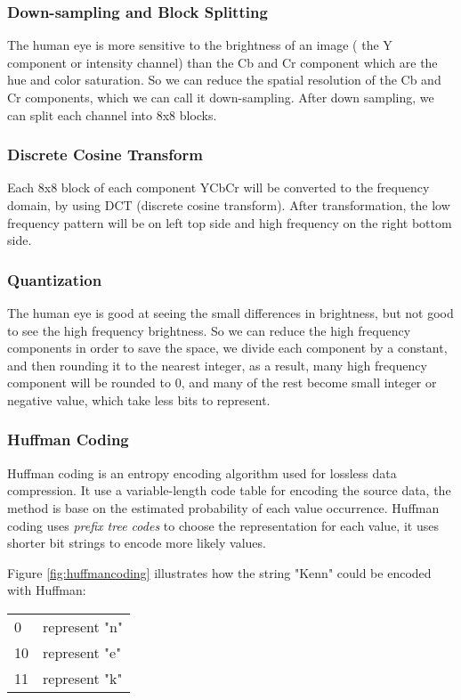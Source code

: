 \subsubsection{Down-sampling and Block Splitting}
The human eye is more sensitive to the brightness of an image ( the Y component or intensity channel) than the Cb and Cr component which are the hue and color saturation. So we can reduce the spatial resolution of the Cb and Cr components, which we can call it down-sampling. After down sampling, we can split each channel into 8x8 blocks. 

\subsubsection{Discrete Cosine Transform}
Each 8x8 block of each component YCbCr will be converted to the frequency domain, by using DCT (discrete cosine transform). After transformation, the low frequency pattern will be on left top side and high frequency on the right bottom side.

\subsubsection{Quantization}
The human eye is good at seeing the small differences in brightness, but not good to see the high frequency brightness. So we can reduce the high frequency components in order to save the space, we divide each component by a constant, and then rounding it to the nearest integer, as a result, many high frequency component will be rounded to 0, and many of the rest become small integer or negative value, which take less bits to represent.


\subsubsection{Huffman Coding}

Huffman coding \cite{huffman} is an entropy encoding algorithm used for lossless data compression. It use a variable-length code table for encoding the source data, the method is base on the estimated probability of each value occurrence. Huffman coding uses \textit{prefix tree codes} to choose the representation for each value, it uses shorter bit strings to encode more likely values. 

Figure \ref{fig:huffmancoding} illustrates how the string "Kenn" could be encoded with Huffman:


\vspace{0.7em}\begin{tabular}{ll}
0  & represent "n"\\
10 & represent "e"\\
11 & represent "k"\\
\end{tabular}

